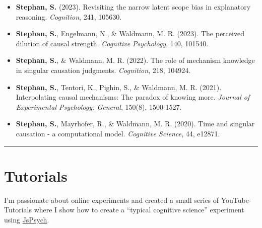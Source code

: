 \documentclass[
]{article}
\begin{document}
\begin{itemize}
\item
  \textbf{Stephan, S.} (2023). Revisiting the narrow latent scope bias
  in explanatory reasoning. \emph{Cognition}, 241,
  105630.{\href{publications/Stephan_2023_RevisitingTheNarrowLatentScopeBias.pdf}{}}
  {\href{https://simonstephan31.github.io/revisit_nlsbias/index.html}{}}
  {\href{https://osf.io/n94ed/}{}}{\href{https://psyarxiv.com/a8cve/}{}}
\item
  \textbf{Stephan, S.}, Engelmann, N., \& Waldmann, M. R. (2023). The
  perceived dilution of causal strength. \emph{Cognitive Psychology},
  140,
  101540.{\href{publications/Stephan_Engelmann_Waldmann_2023_strengthDilution.pdf}{}}
  {\href{https://simonstephan31.github.io/The-Dilution-of-Causal-Strength/index.html}{}}
  {\href{https://osf.io/nrv7p/}{}}
\item
  \textbf{Stephan, S.}, \& Waldmann, M. R. (2022). The role of mechanism
  knowledge in singular causation judgments. \emph{Cognition}, 218,
  104924.
  {\href{publications/Stephan_Waldmann_2021_MechanismCognit.pdf}{}}
  {\href{https://osf.io/325pr/}{}}
  {\href{https://github.com/SimonStephan31/The-Role-of-Mechanism-Information-in-Singular-Causation}{}}
\item
  \textbf{Stephan, S.}, Tentori, K., Pighin, S., \& Waldmann, M. R.
  (2021). Interpolating causal mechanisms: The paradox of knowing more.
  \emph{Journal of Experimental Psychology: General}, 150(8), 1500-1527.
  {\href{https://doi.apa.org/fulltext/2021-13036-001.pdf}{}}
  {\href{https://osf.io/aqzps/}{}}
\item
  \textbf{Stephan, S.}, Mayrhofer, R., \& Waldmann, M. R. (2020). Time
  and singular causation - a computational model. \emph{Cognitive
  Science}, 44, e12871.
  {\href{https://onlinelibrary.wiley.com/doi/epdf/10.1111/cogs.12871}{}}
  {\href{https://osf.io/5yvs4/}{}} {\href{https://osf.io/n93bu}{}}
\end{itemize}

\begin{center}\rule{0.5\linewidth}{0.5pt}\end{center}

\hfill\break

\hypertarget{tutorials}{%
\section{Tutorials}\label{tutorials}}

I'm passionate about online experiments and created a small series of
YouTube-Tutorials where I show how to create a ``typical cognitive
science'' experiment using \href{https://www.jspsych.org/7.3/}{JsPsych}.
\end{document}
